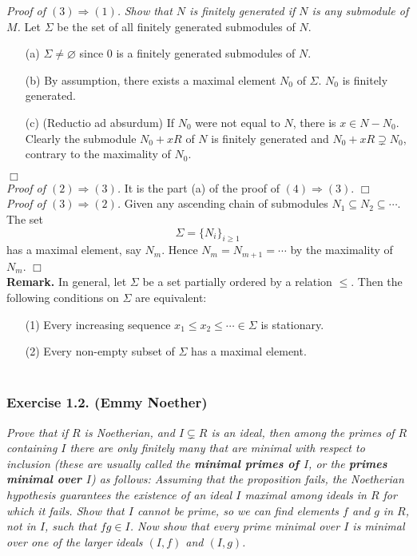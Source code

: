 \documentclass{article}
\begin{document}
\emph{Proof of $(3) \Rightarrow (1)$.}
\emph{Show that $N$ is finitely generated if $N$ is any submodule of $M$.}
Let $\Sigma$ be the set of all finitely generated submodules of $N$.
\begin{enumerate}
\item[(a)]
$\Sigma \neq \varnothing$ since $0$ is a finitely generated submodules of $N$.
\item[(b)]
By assumption, there exists a maximal element $N_0$ of $\Sigma$.
$N_0$ is finitely generated.
\item[(c)]
(Reductio ad absurdum)
If $N_0$ were not equal to $N$, there is $x \in N - N_0$.
Clearly the submodule $N_0 + xR$ of $N$ is finitely generated and
$N_0 + xR \supsetneq N_0$, contrary to the maximality of $N_0$.
\end{enumerate}
$\Box$ \\

\emph{Proof of $(2) \Rightarrow (3)$.}
It is the part (a) of the proof of $(4) \Rightarrow (3)$.
$\Box$ \\

\emph{Proof of $(3) \Rightarrow (2)$.}
Given any ascending chain of submodules $N_1 \subseteq N_2 \subseteq \cdots$.
The set $$\Sigma = \{N_i\}_{i \geq 1}$$ has a maximal element, say $N_m$.
Hence $N_m = N_{m+1} = \cdots$ by the maximality of $N_m$.
$\Box$ \\

\textbf{Remark.}
In general, let $\Sigma$ be a set partially ordered by a relation $\leq$.
Then the following conditions on $\Sigma$ are equivalent:
\begin{enumerate}
\item[(1)]
Every increasing sequence $x_1 \leq x_2 \leq \cdots \in \Sigma$ is stationary.
\item[(2)]
Every non-empty subset of $\Sigma$ has a maximal element. \\\\
\end{enumerate}






\subsubsection*{Exercise 1.2. (Emmy Noether)}
\emph{Prove that if $R$ is Noetherian,
and $I \subsetneq R$ is an ideal,
then among the primes of $R$ containing $I$ there are only finitely many
that are minimal with respect to inclusion
(these are usually called the \textbf{minimal primes of $I$},
or the \textbf{primes minimal over $I$}) as follows:
Assuming that the proposition fails, the Noetherian hypothesis guarantees
the existence of an ideal $I$ maximal among ideals in $R$ for which it fails.
Show that $I$ cannot be prime,
so we can find elements $f$ and $g$ in $R$, not in $I$, such that $fg \in I$.
Now show that every prime minimal over $I$ is minimal over
one of the larger ideals $(I,f)$ and $(I,g)$.} \\
\end{document}
